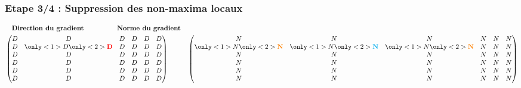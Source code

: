 \documentclass{beamer}
\begin{document}
\begin{frame}
\frametitle{Etape 3/4 : Suppression des non-maxima locaux}

\begin{center}
{\only<2>{\textcolor{red}{\textbf{Classe 1}} : $ \text{\emph{arg}} \in [0; 22.5[ $ ou $ \text{\emph{arg}} \in [157.5; 180] $}}


\end{center}
\begin{align*}
& \quad \textbf{Direction du gradient} \qquad \qquad \quad \textbf{Norme du gradient} \\
& \begin{pmatrix}
D & D & D & D & D & D \\
D & {\only<1>{D}}{\only<2>{\color{red}\textbf{D}}} & D & D & D & D \\
D & D & D & D & D & D \\
D & D & D & D & D & D \\
D & D & D & D & D & D \\
D & D & D & D & D & D \\
\end{pmatrix}
\qquad \quad
\begin{pmatrix}
N & N & N & N & N & N \\
{\only<1>{N}}{\only<2>{\color{orange}\textbf{N}}} & {\only<1>{N}}{\only<2>{\color{cyan}\textbf{N}}}  & {\only<1>{N}}{\only<2>{\color{orange}\textbf{N}}} & N & N & N \\
N & N & N & N & N & N \\
N & N & N & N & N & N \\
N & N & N & N & N & N \\
N & N & N & N & N & N \\
\end{pmatrix}
\end{align*}

{}

\end{frame}
\end{document}
